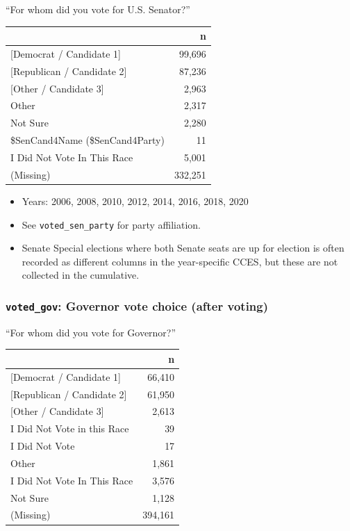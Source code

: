 \documentclass[10pt,article,oneside]{memoir}
\theoremstyle{definition}
\begin{document}
``For whom did you vote for U.S. Senator?''

\begin{table}[H]
\centering
\begin{tabular}[t]{lr}
\toprule
 & n\\
\midrule
{}{[Democrat / Candidate 1]} & 99,696\\
{}{[Republican / Candidate 2]} & 87,236\\
{}{[Other / Candidate 3]} & 2,963\\
Other & 2,317\\
Not Sure & 2,280\\
\$SenCand4Name (\$SenCand4Party) & 11\\
I Did Not Vote In This Race & 5,001\\
(Missing) & 332,251\\
\bottomrule
\end{tabular}
\end{table}

\begin{itemize}
\tightlist
\item
  Years: 2006, 2008, 2010, 2012, 2014, 2016, 2018, 2020
\item
  See \texttt{voted\_sen\_party} for party affiliation.
\item
  Senate Special elections where both Senate seats are up for election
  is often recorded as different columns in the year-specific CCES, but
  these are not collected in the cumulative.
\end{itemize}

\hypertarget{voted_gov-governor-vote-choice-after-voting}{%
\subsubsection{\texorpdfstring{\texttt{voted\_gov}: Governor vote choice
(after
voting)}{voted\_gov: Governor vote choice (after voting)}}\label{voted_gov-governor-vote-choice-after-voting}}

``For whom did you vote for Governor?''

\begin{table}[H]
\centering
\begin{tabular}[t]{lr}
\toprule
 & n\\
\midrule
{}{[Democrat / Candidate 1]} & 66,410\\
{}{[Republican / Candidate 2]} & 61,950\\
{}{[Other / Candidate 3]} & 2,613\\
I Did Not Vote in this Race & 39\\
I Did Not Vote & 17\\
Other & 1,861\\
I Did Not Vote In This Race & 3,576\\
Not Sure & 1,128\\
(Missing) & 394,161\\
\bottomrule
\end{tabular}
\end{table}
\end{document}
